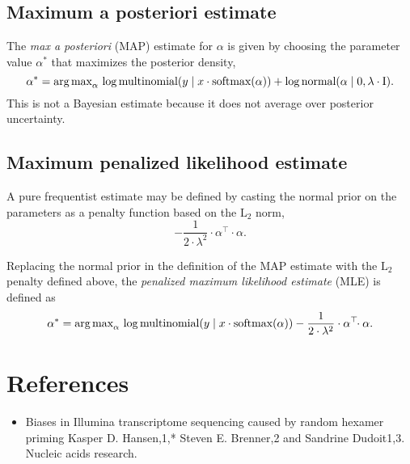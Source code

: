 \documentclass[11pt]{article}
\begin{document}
\subsection{Maximum a posteriori estimate}

The \emph{max a posteriori} (MAP) estimate for $\alpha$ is given by
choosing the parameter value $\alpha^*$ that maximizes the posterior
density,
\[
  \alpha^* = \textrm{arg\,max}_{\alpha} \,
  \log \textrm{multinomial}(y \mid x \cdot \textrm{softmax}(\alpha))
  + \log \textrm{normal}(\alpha \mid 0, \lambda \cdot \textrm{I}).
\]
This is not a Bayesian estimate because it does not average over
posterior uncertainty.


\subsection{Maximum penalized likelihood estimate}

A pure frequentist estimate may be defined by casting the normal prior
on the parameters as a penalty function based on the $\textrm{L}_2$
norm,
\[
  -\frac{1}{2 \cdot \lambda^2} \cdot \alpha^{\top}\!\! \cdot \alpha.
\]

Replacing the normal prior in the definition of the MAP estimate with
the $\textrm{L}_2$ penalty defined above, the
\emph{penalized maximum likelihood estimate} (MLE) is defined as
\[
  \alpha^* = \textrm{arg\,max}_{\alpha} \,
  \log \textrm{multinomial}(y \mid x \cdot \textrm{softmax}(\alpha))
  - \frac{1}{2 \cdot \lambda^2} \cdot \alpha^{\top}\!\! \cdot \alpha.
\]


\section*{References}

\begin{itemize}
\item Biases in Illumina transcriptome sequencing caused by random
  hexamer priming Kasper D. Hansen,1,* Steven E. Brenner,2 and
  Sandrine Dudoit1,3.  Nucleic acids research.
\end{itemize}
\end{document}
